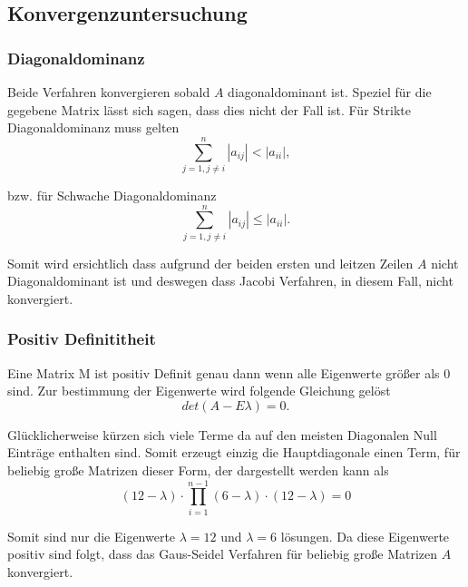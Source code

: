 \documentclass[12pt,titlepage]{article}
\begin{document}
	\subsection{Konvergenzuntersuchung}
		
		\subsubsection{Diagonaldominanz}
			Beide Verfahren konvergieren sobald $A$ diagonaldominant ist. Speziel
			für die gegebene Matrix lässt sich sagen, dass dies nicht der Fall ist.
			Für Strikte Diagonaldominanz muss gelten
			\begin{equation*}
				\sum_{j = 1, j \neq i}^{n} |a_{ij}| < |a_{ii}|,
			\end{equation*}
		
			bzw. für Schwache Diagonaldominanz
			\begin{equation*}
				\sum_{j = 1, j \neq i}^{n} |a_{ij}| \leq |a_{ii}|.
			\end{equation*}
		
			Somit wird ersichtlich dass aufgrund der beiden ersten und leitzen Zeilen
			$A$ nicht Diagonaldominant ist und deswegen dass Jacobi Verfahren, in diesem Fall, nicht
			konvergiert.

		\subsubsection{Positiv Definititheit}
		
			Eine Matrix M ist positiv Definit genau dann wenn alle Eigenwerte größer als $0$ sind. Zur bestimmung der Eigenwerte wird folgende Gleichung gelöst
			\begin{equation*}
				det(A - E\lambda) = 0.
			\end{equation*}
			
			Glücklicherweise kürzen sich viele Terme da auf den meisten Diagonalen Null Einträge enthalten sind. Somit erzeugt einzig die Hauptdiagonale einen Term, für beliebig große Matrizen dieser Form,
			der dargestellt werden kann als
			\begin{equation*}
				(12-\lambda)\cdot\prod_{i=1}^{n-1}(6-\lambda) \cdot (12-\lambda) = 0
			\end{equation*}
			
			Somit sind nur die Eigenwerte $\lambda = 12$ und $\lambda = 6$ lösungen. Da diese Eigenwerte positiv sind folgt, dass das Gaus-Seidel Verfahren für beliebig große Matrizen $A$ konvergiert.
			
\end{document}
